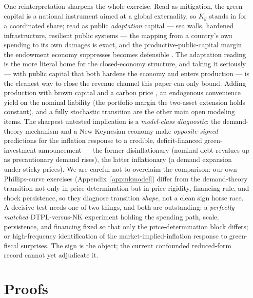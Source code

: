 \documentclass[12pt]{article}
\makeatletter
\newcommand{\FloatBarrier}{\par
    \begingroup\let\@elt\relax
    \edef\reserved@a{\@deferlist}\endgroup
    \ifx\reserved@a\@empty\else\clearpage\fi}
\makeatother
\begin{document}
One reinterpretation sharpens the whole exercise. Read as mitigation, the
green capital is a national instrument aimed at a global externality, so
$K_g$ stands in for a coordinated share; read as public \emph{adaptation}
capital --- sea walls, hardened infrastructure, resilient public systems ---
the mapping from a country's own spending to its own damages is exact, and
the productive-public-capital margin the endowment economy suppresses becomes
defensible \citep{fried2022seawalls,konradtweder2023}. The adaptation reading
is the more literal home for the closed-economy structure, and taking it
seriously --- with public capital that both hardens the economy and enters
production --- is the cleanest way to close the revenue channel this paper
can only bound. Adding production with brown
capital and a carbon price \citep{barrage2020}, an endogenous convenience
yield on the nominal liability (the portfolio margin the two-asset
extension holds constant), and a fully stochastic
transition are the other main open modeling items. The sharpest untested
implication is a \emph{model-class diagnostic}: the demand-theory mechanism
and a New Keynesian economy make \emph{opposite-signed} predictions for the
inflation response to a credible, deficit-financed green-investment
announcement --- the former disinflationary (nominal debt revalues up as
precautionary demand rises), the latter inflationary (a demand expansion under
sticky prices). We are careful not to overclaim the comparison: our own
Phillips-curve exercises (Appendix~\ref{app:nkmodel}) differ from the
demand-theory transition not only in price determination but in price
rigidity, financing rule, and shock persistence, so they diagnose transition
\emph{shape}, not a clean sign horse race. A decisive test needs one of two
things, and both are outstanding: a \emph{perfectly matched} DTPL-versus-NK
experiment holding the spending path, scale, persistence, and financing fixed
so that only the price-determination block differs; or high-frequency
identification of the market-implied-inflation response to green-fiscal
surprises. The sign is the object; the current confounded reduced-form record
cannot yet adjudicate it.

\appendix
\FloatBarrier
\section{Proofs}\label{app:proofs}
\end{document}
